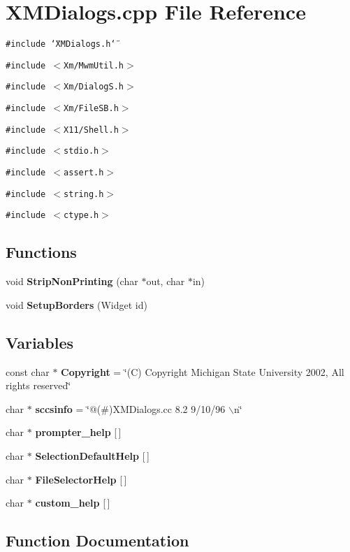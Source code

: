 \section{XMDialogs.cpp File Reference}
\label{XMDialogs_8cpp}
{\tt \#include \char`\"{}XMDialogs.h\char`\"{}}\par
{\tt \#include $<$Xm/Mwm\-Util.h$>$}\par
{\tt \#include $<$Xm/Dialog\-S.h$>$}\par
{\tt \#include $<$Xm/File\-SB.h$>$}\par
{\tt \#include $<$X11/Shell.h$>$}\par
{\tt \#include $<$stdio.h$>$}\par
{\tt \#include $<$assert.h$>$}\par
{\tt \#include $<$string.h$>$}\par
{\tt \#include $<$ctype.h$>$}\par
\subsection*{Functions}
\begin{CompactItemize}
\item 
void {\bf Strip\-Non\-Printing} (char $\ast$out, char $\ast$in)
\item 
void {\bf Setup\-Borders} (Widget id)
\end{CompactItemize}
\subsection*{Variables}
\begin{CompactItemize}
\item 
const char $\ast$ {\bf Copyright} = \char`\"{}(C) Copyright Michigan State University 2002, All rights reserved\char`\"{}
\item 
char $\ast$ {\bf sccsinfo} = \char`\"{}@(\#)XMDialogs.cc 8.2 9/10/96 $\backslash$n\char`\"{}
\item 
char $\ast$ {\bf prompter\_\-help} [$\,$]
\item 
char $\ast$ {\bf Selection\-Default\-Help} [$\,$]
\item 
char $\ast$ {\bf File\-Selector\-Help} [$\,$]
\item 
char $\ast$ {\bf custom\_\-help} [$\,$]
\end{CompactItemize}


\subsection{Function Documentation}
